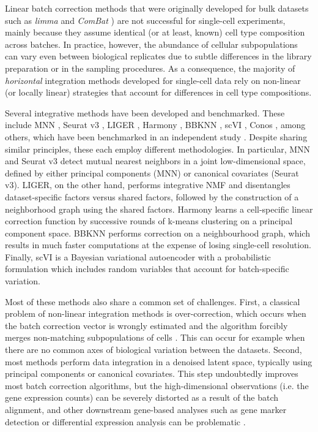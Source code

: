 Linear batch correction methods that were originally developed for bulk datasets such as \textit{limma} \cite{Ritchie2015b} and \textit{ComBat} \cite{Johnson2006}) are not successful for single-cell experiments, mainly because they assume identical (or at least, known) cell type composition across batches. In practice, however, the abundance of cellular subpopulations can vary even between biological replicates due to subtle differences in the library preparation or in the sampling procedures. As a consequence, the majority of \textit{horizontal} integration methods developed for single-cell data rely on non-linear (or locally linear) strategies that account for differences in cell type compositions.

Several integrative methods have been developed and benchmarked. These include MNN \cite{Haghverdi2018}, Seurat v3 \cite{Butler2018}, LIGER \cite{Welch2019}, Harmony \cite{Korsunsky2019}, BBKNN \cite{Polanski2019}, scVI \cite{Lopez2018}, Conos \cite{Barkas2019}, among others, which have been benchmarked in an independent study \cite{Luecken2020}. Despite sharing similar principles, these each employ different methodologies. In particular, MNN and Seurat v3 detect mutual nearest neighbors in a joint low-dimensional space, defined by either principal components (MNN) or canonical covariates (Seurat v3). LIGER, on the other hand, performs integrative NMF and disentangles dataset-specific factors versus shared factors, followed by the construction of a neighborhood graph using the shared factors. Harmony learns a cell-specific linear correction function by successive rounds of k-means clustering on a principal component space. BBKNN performs correction on a neighbourhood graph, which results in much faster computations at the expense of losing single-cell resolution. Finally, scVI is a Bayesian variational autoencoder with a probabilistic formulation which includes random variables that account for batch-specific variation.

Most of these methods also share a common set of challenges. First, a classical problem of non-linear integration methods is over-correction, which occurs when the batch correction vector is wrongly estimated and the algorithm forcibly merges non-matching subpopulations of cells \cite{Luecken2020}. This can occur for example when there are no common axes of biological variation between the datasets. Second, most methods perform data integration in a denoised latent space, typically using principal components or canonical covariates. This step undoubtedly improves most batch correction algorithms, but the high-dimensional observations (i.e. the gene expression counts) can be severely distorted as a result of the batch alignment, and other downstream gene-based analyses such as gene marker detection or differential expression analysis can be problematic \cite{Haghverdi2018}.

